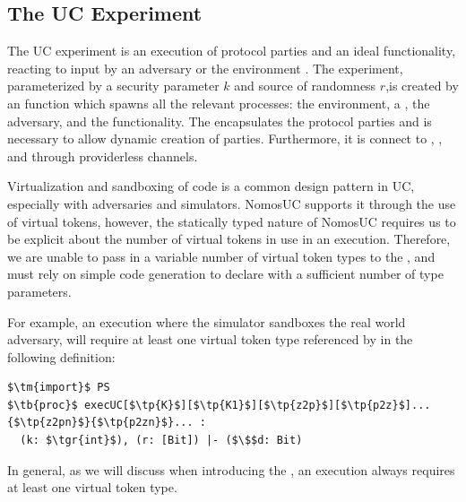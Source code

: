 \subsection{The UC Experiment}
The UC experiment is an execution of protocol parties and an ideal functionality, reacting to input by an adversary \A or the environment \Z.
The experiment, parameterized by a security parameter $k$ and source of randomness $r$,is created by an  function  which spawns all the relevant processes: the environment, a \partywrapper, the adversary, and the functionality.
The \partywrapper encapsulates the protocol parties and is necessary to allow dynamic creation of parties. 
Furthermore, it is connect to \Z, \A, and \F through providerless channels.

Virtualization and sandboxing of code is a common design pattern in UC, especially with adversaries and simulators.
NomosUC supports it through the use of virtual tokens, however, the statically typed nature of NomosUC requires us to be explicit about the number of virtual tokens in use in an execution.
Therefore, we are unable to pass in a variable number of virtual token types to the , and must rely on simple code generation to declare  with a sufficient number of type parameters.

For example, an execution where the simulator sandboxes the real world adversary,  will require at least one virtual token type referenced by  in the following definition:
\begin{lstlisting}[basicstyle=\footnotesize\BeraMonottFamily, frame=single, mathescape, caption={The process definition of the \msf{execUC} function.}]
$\tm{import}$ PS 
$\tb{proc}$ execUC[$\tp{K}$][$\tp{K1}$][$\tp{z2p}$][$\tp{p2z}$]...{$\tp{z2pn}$}{$\tp{p2zn}$}... :
  (k: $\tgr{int}$), (r: [Bit]) |- ($\$$d: Bit)
\end{lstlisting}
In general, as we will discuss when introducing the \partywrapper, an execution always requires at least one virtual token type.

%

